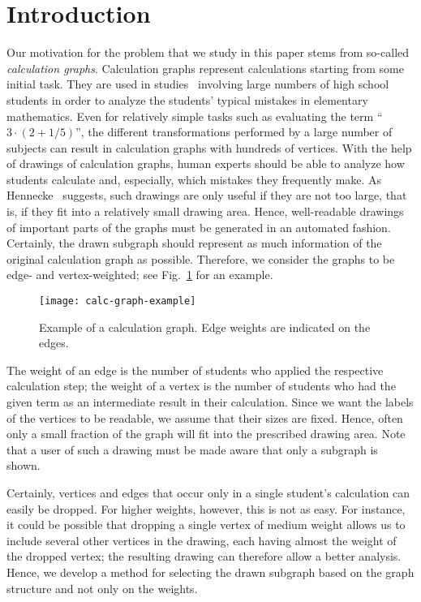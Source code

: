\documentclass[]{llncs}
\begin{document}
\section{Introduction}
Our motivation for the problem that we study in this paper stems from
so-called \emph{calculation graphs}.  Calculation graphs
represent calculations starting from some initial task.  They
are used in studies~\cite{hennecke07} involving large numbers of high school
students in order to analyze the students' typical mistakes in elementary
mathematics. Even for relatively simple tasks such as evaluating the
term ``$3 \cdot (2 + 1/5)$'', the different transformations
performed by a large number of subjects can result in calculation
graphs with hundreds of vertices. With the help of drawings of
calculation graphs, human experts should be able to analyze how
students calculate and, especially, which mistakes they frequently
make. As Hennecke~\cite{hennecke07} suggests, such drawings
are only useful if they are not too large, that is, if
they fit into a relatively small drawing area. Hence, well-readable
drawings of important parts of the graphs must be generated in an
automated fashion. 
Certainly, the drawn subgraph should represent as much information
of the original calculation graph as possible. 
Therefore, we consider the graphs to be edge- and
vertex-weighted; see Fig.~\ref{fig:calc-graph-example} for an
example.
\begin{figure}[h]
	\centering
	\texttt{[image: calc-graph-example]}
	\caption{Example of a calculation graph. Edge weights are indicated
	on the edges.}
	\label{fig:calc-graph-example}
\end{figure}
The weight of an edge is the number of students who
applied the respective calculation step; the weight of a vertex is the
number of students who had the given term as an intermediate result in
their calculation.
Since we want the labels of the vertices to be readable, we assume
that their sizes are fixed.  Hence, often only a small fraction of the
graph will fit into the prescribed drawing area.
Note that a user of such a drawing must be made aware that
only a subgraph is shown.

Certainly, vertices and edges that occur
only in a single student's calculation can easily be dropped. For
higher weights, however, this is not as easy. For instance, it could
be possible that dropping a single vertex of medium weight allows us
to include several other vertices in the drawing, each having almost
the weight of the dropped vertex; the resulting drawing can therefore
allow a better analysis. Hence, we develop a method for
selecting the drawn subgraph based on the graph structure and not only
on the weights.
\end{document}
